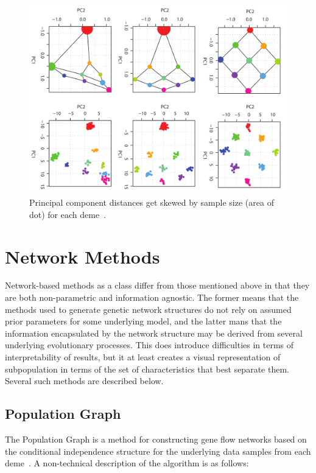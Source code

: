 \documentclass{essay}
\begin{document}
\begin{figure}
  \includegraphics[width=.9\linewidth,keepaspectratio]{../Figures/fig2.png}
  \caption{Principal component distances get skewed by sample size (area of
  dot) for each deme~\cite{mcvean_genealogical_2009}.}
\end{figure}


\section{Network Methods}

Network-based methods as a class differ from those mentioned above in that they
are both non-parametric and information agnostic. The former means that the
methods used to generate genetic network structures do not rely on assumed
prior parameters for some underlying model, and the latter mans that the
information encapsulated by the network structure may be derived from several
underlying evolutionary processes. This does introduce difficulties in terms of
interpretability of results, but it at least creates a visual representation of
subpopulation in terms of the set of characteristics that best separate them.
Several such methods are described below.

\subsection{Population Graph}

The Population Graph is a method for constructing gene flow networks based on
the conditional independence structure for the underlying data samples from
each deme~\cite{dyer_population_2004}. A non-technical description of the
algorithm is as follows:
\end{document}
